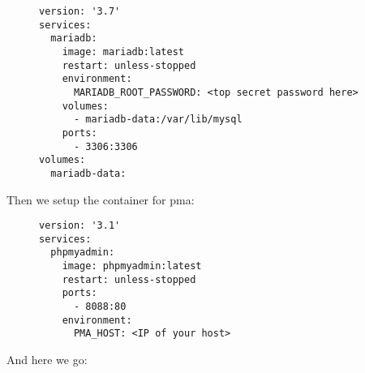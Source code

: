 \begin{figure}[H]
    \scriptsize
    \centering
    \begin{BVerbatim}
version: '3.7'
services:
  mariadb:
    image: mariadb:latest
    restart: unless-stopped
    environment:
      MARIADB_ROOT_PASSWORD: <top secret password here>
    volumes:
      - mariadb-data:/var/lib/mysql
    ports:
      - 3306:3306
volumes:
  mariadb-data:
    \end{BVerbatim}
\end{figure}

Then we setup the container for \gls{pma}:

\begin{figure}[H]
    \scriptsize
    \centering
    \begin{BVerbatim}
version: '3.1'
services:
  phpmyadmin:
    image: phpmyadmin:latest
    restart: unless-stopped
    ports:
      - 8088:80
    environment:
      PMA_HOST: <IP of your host>
    \end{BVerbatim}
\end{figure}

And here we go:

